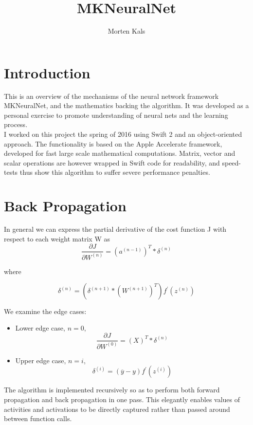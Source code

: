 \documentclass[11pt]{article}
\begin{document}
\title{MKNeuralNet}
\author{Morten Kals}
\maketitle

\section{Introduction}
This is an overview of the mechanisms of the neural network framework MKNeuralNet, and the mathematics backing the algorithm. It was developed as a personal exercise to promote understanding of neural nets and the learning process. \\

I worked on this project the spring of 2016 using Swift 2 and an object-oriented approach. The functionality is based on the Apple Accelerate framework, developed for fast large scale mathematical computations. Matrix, vector and scalar operations are however wrapped in Swift code for readability, and speed-tests thus show this algorithm to suffer severe performance penalties. 

\section{Back Propagation}

In general we can express the partial derivative of the cost function J with respect to each weight matrix W as
\[ 
\frac{\partial J }{\partial W^{(n)}} = \left ( a^{(n-1)} \right ) ^T * \delta ^{(n)} 
\]

where 

\[
\delta ^{(n)} = \left( \delta ^{(n+1)} * \left(W^{(n+1)}\right) ^T \right ) f^\prime (z^{(n)})
\]

We examine the edge cases: 

\begin{itemize}

	\item Lower edge case, $ n = 0 $, 
\[
\frac{\partial J }{\partial W^{(0)}} = \left( X \right) ^T * \delta ^{(n)} 
\]

	\item Upper edge case, $ n = i $, 
\[
\delta ^{(i)} = (\overline y - y ) f^\prime (z^{(i)})
\]

\end{itemize}


The algorithm is implemented recursively so as to perform both forward propagation and back propagation in one pass. This elegantly enables values of activities and activations to be directly captured rather than passed around between function calls. \\
\end{document}
